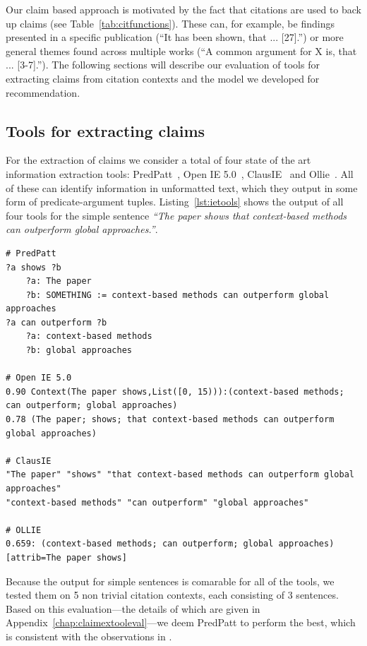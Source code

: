 Our claim based approach is motivated by the fact that citations are used to back up claims (see Table~\ref{tab:citfunctions}). These can, for example, be findings presented in a specific publication (``It has been shown, that ... [27].'') or more general themes found across multiple works (``A common argument for X is, that ... [3-7].''). The following sections will describe our evaluation of tools for extracting claims from citation contexts and the model we developed for recommendation.

\subsection{Tools for extracting claims}
For the extraction of claims we consider a total of four state of the art \cite{Zhang2017} information extraction tools: PredPatt~\cite{White2016}, Open IE 5.0~\cite{Mausam2016}, ClausIE~\cite{DelCorro2013} and Ollie~\cite{Mausam2012}. All of these can identify information in unformatted text, which they output in some form of predicate-argument tuples. Listing~\ref{lst:ietools} shows the output of all four tools for the simple sentence \emph{``The paper shows that context-based methods can outperform global approaches.''}.

\begin{lstlisting}[caption={Information extraction tool output examples.},label={lst:ietools}]
# PredPatt
?a shows ?b
    ?a: The paper
    ?b: SOMETHING := context-based methods can outperform global approaches
?a can outperform ?b
    ?a: context-based methods
    ?b: global approaches

# Open IE 5.0
0.90 Context(The paper shows,List([0, 15))):(context-based methods; can outperform; global approaches)
0.78 (The paper; shows; that context-based methods can outperform global approaches)

# ClausIE
"The paper" "shows" "that context-based methods can outperform global approaches"
"context-based methods" "can outperform" "global approaches"

# OLLIE
0.659: (context-based methods; can outperform; global approaches)[attrib=The paper shows]
\end{lstlisting}

Because the output for simple sentences is comarable for all of the tools, we tested them on 5 non trivial citation contexts, each consisting of 3 sentences. Based on this evaluation---the details of which are given in Appendix~\ref{chap:claimextooleval}---we deem PredPatt to perform the best, which is consistent with the observations in \cite{Zhang2017}.

